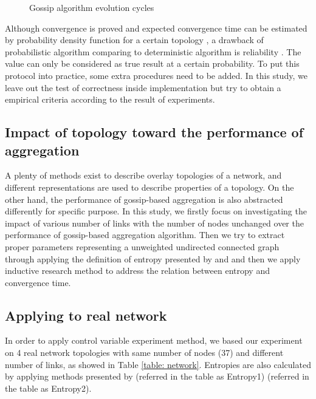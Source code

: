 \documentclass[11pt,a4paper]{article}
\begin{document}
\begin{figure}[!h]
   \caption{Gossip algorithm evolution cycles}
   \label{fig: cycles}
\end{figure}


Although convergence is proved and expected convergence time can be estimated by probability density function for a certain topology \cite{5929538}, a drawback of probabilistic algorithm comparing to deterministic algorithm is reliability \cite{Lynch:1996:DA:525656}. The value can only be considered as true result at a certain probability. To put this protocol into practice, some extra procedures need to be added. In this study, we leave out the test of correctness inside implementation but try to obtain a empirical criteria according to the result of experiments.\\

\subsection{Impact of topology toward the performance of aggregation}
A plenty of methods exist to describe overlay topologies of a network, and different representations are used to describe properties of a topology. On the other hand, the performance of gossip-based aggregation is also abstracted differently for specific purpose.
In this study, we firstly focus on investigating the impact of various number of links with the number of nodes unchanged over the performance of gossip-based aggregation algorithm. Then we try to extract proper parameters representing a unweighted undirected connected graph through applying the definition of entropy presented by \cite{entropy1} and \cite{entropy2} and then we apply inductive research method \cite{portal} to address the relation between entropy and convergence time.



\subsection{Applying to real network}
In order to apply control variable experiment method, we based our experiment on 4 real network topologies with same number of nodes (37) and different number of links, as showed in Table \ref{table: network}. Entropies are also calculated by applying methods presented by \cite{entropy1} (referred in the table as Entropy1) \cite{entropy2} (referred in the table as Entropy2).
\end{document}
